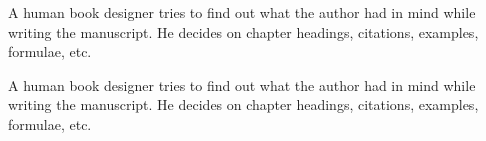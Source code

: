 \documentclass[11pt]{book}
\begin{document}
A human book designer tries to find out what the author had in mind
while writing the manuscript. He decides on chapter headings, citations,
examples, formulae, etc.
\begin{sloppypar}
A human book designer tries to find out what the author had in mind
while writing the manuscript. He decides on chapter headings, citations,
examples, formulae, etc.
\end{sloppypar}
\end{document}
